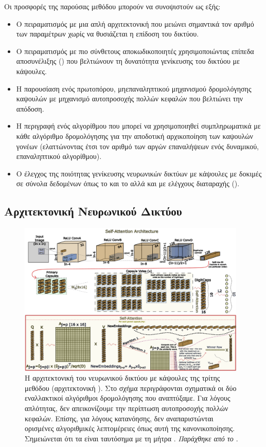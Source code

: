 Οι προσφορές της παρούσας μεθόδου μπορούν να συνοψιστούν ως εξής:
\begin{itemize}
  \item Ο πειραματισμός με μια απλή αρχιτεκτονική που μειώνει σημαντικά τον αριθμό των παραμέτρων χωρίς να θυσιάζεται η επίδοση του δικτύου.
  \item Ο πειραματισμός με πιο σύνθετους αποκωδικοποιητές χρησιμοποιώντας επίπεδα αποσυνέλιξης () που βελτιώνουν τη δυνατότητα γενίκευσης του δικτύου με κάψουλες.
  \item Η παρουσίαση ενός πρωτοπόρου, μη\textendash επαναληπτικού μηχανισμού δρομολόγησης καψουλών με μηχανισμό αυτο\textendash προσοχής πολλών κεφαλών που βελτιώνει την απόδοση.
  \item Η περιγραφή ενός αλγορίθμου που μπορεί να χρησιμοποιηθεί συμπληρωματικά με κάθε αλγόριθμο δρομολόγησης για την αποδοτική αρχικοποίηση των καψουλών γονέων (ελαττώνοντας έτσι τον αριθμό των αργών επαναλήψεων ενός δυναμικού, επαναληπτικού αλγορίθμου).
  \item Ο έλεγχος της ποιότητας γενίκευσης νευρωνικών δικτύων με κάψουλες με δοκιμές σε σύνολα δεδομένων όπως το  και το  αλλά και με ελέγχους διαταραχής ().
\end{itemize}

\subsection{Αρχιτεκτονική Νευρωνικού Δικτύου}

\begin{figure}[h]
  \centering
  \includegraphics[width=0.97\textwidth]{images/chapter method/therd_method_architecture_encoder.pdf}
  \caption{Η αρχιτεκτονική του νευρωνικού δικτύου με κάψουλες της τρίτης μεθόδου (αρχιτεκτονική ). Στο σχήμα περιγράφονται σχηματικά οι δύο εναλλακτικοί αλγόριθμοι δρομολόγησης που αναπτύξαμε. Για λόγους απλότητας, δεν απεικονίζουμε την περίπτωση αυτο\textendash προσοχής πολλών κεφαλών. Επίσης, για λόγους κατανόησης, δεν αναπαριστώνται ορισμένες αλγοριθμικές λεπτομέρειες όπως αυτή της κανονικοποίησης. Σημειώνεται ότι τα  είναι ταυτόσημα με τη μήτρα . \textit{Παράχθηκε από το \href{https://inkscape.org/}{}}.}
  \label{fig:method_3_architecture}
\end{figure}

